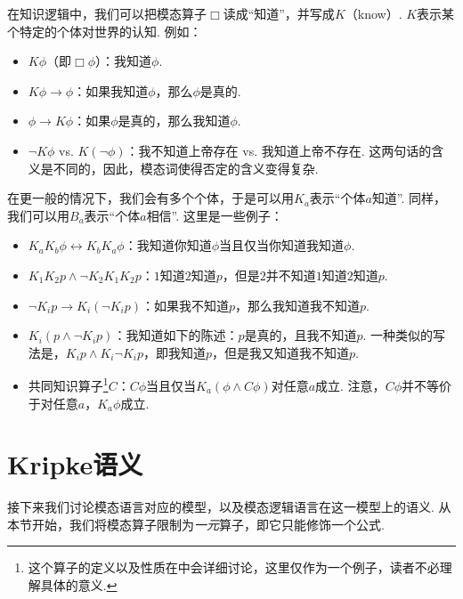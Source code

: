 \begin{example}[知识逻辑]

在知识逻辑中，我们可以把模态算子$\Box$读成“知道”，并写成$K$（know）. $K$表示某个特定的个体对世界的认知. 例如：

\begin{itemize}
    \item $K\phi$（即$\Box\phi$）：我知道$\phi$. 
    \item $K\phi\to\phi$：如果我知道$\phi$，那么$\phi$是真的. 
    \item $\phi\to K\phi$：如果$\phi$是真的，那么我知道$\phi$. 
    \item $\neg K\phi$ vs. $K(\neg\phi)$：我不知道上帝存在 vs. 我知道上帝不存在. 这两句话的含义是不同的，因此，模态词使得否定的含义变得复杂. 
\end{itemize}

在更一般的情况下，我们会有多个个体，于是可以用$K_a$表示“个体$a$知道”. 同样，我们可以用$B_a$表示“个体$a$相信”. 这里是一些例子：

\begin{itemize}
    \item $K_aK_b\phi\leftrightarrow K_bK_a\phi$：我知道你知道$\phi$当且仅当你知道我知道$\phi$. 
    \item $K_1K_2p\wedge \neg K_2K_1K_2 p$：$1$知道$2$知道$p$，但是$2$并不知道$1$知道$2$知道$p$. 
    \item $\neg K_i p\to K_i(\neg K_i p)$：如果我不知道$p$，那么我知道我不知道$p$. 
    \item $K_i(p\wedge\neg K_i p)$：我知道如下的陈述：$p$是真的，且我不知道$p$. 一种类似的写法是，$K_ip\wedge K_i\neg K_ip$，即我知道$p$，但是我又知道我不知道$p$. 
    \item 共同知识算子\footnote{这个算子的定义以及性质在中会详细讨论，这里仅作为一个例子，读者不必理解具体的意义. }$C$：$C \phi$当且仅当$K_a(\phi\wedge C\phi)$对任意$a$成立. 注意，$C\phi$并不等价于对任意$a$，$K_a\phi$成立. 
\end{itemize}
\end{example}

\section{Kripke语义}\label{sec:kripke-semantics}

接下来我们讨论模态语言对应的模型，以及模态逻辑语言在这一模型上的语义. 从本节开始，我们将模态算子限制为\emph{一元}算子，即它只能修饰一个公式. 


